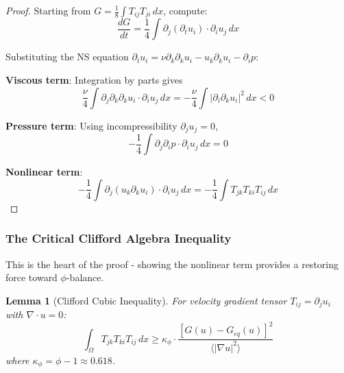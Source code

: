 \documentclass[12pt,a4paper]{article}
\newtheorem{lemma}[theorem]{Lemma}
\begin{document}
\begin{proof}
Starting from $G = \frac{1}{8} \int T_{ij} T_{ji}\, dx$, compute:
\begin{equation}
\frac{dG}{dt} = \frac{1}{4} \int \partial_j(\partial_t u_i) \cdot \partial_i u_j\, dx
\end{equation}

Substituting the NS equation $\partial_t u_i = \nu \partial_k \partial_k u_i - u_k \partial_k u_i - \partial_i p$:

\textbf{Viscous term}: Integration by parts gives
\begin{equation}
\frac{\nu}{4} \int \partial_j \partial_k \partial_k u_i \cdot \partial_i u_j\, dx = -\frac{\nu}{4} \int |\partial_i \partial_k u_i|^2\, dx < 0
\end{equation}

\textbf{Pressure term}: Using incompressibility $\partial_j u_j = 0$,
\begin{equation}
-\frac{1}{4} \int \partial_j \partial_i p \cdot \partial_i u_j\, dx = 0
\end{equation}

\textbf{Nonlinear term}: 
\begin{equation}
-\frac{1}{4} \int \partial_j(u_k \partial_k u_i) \cdot \partial_i u_j\, dx = -\frac{1}{4} \int T_{jk} T_{ki} T_{ij}\, dx
\end{equation}
\end{proof}

\subsubsection{The Critical Clifford Algebra Inequality}

This is the heart of the proof - showing the nonlinear term provides a restoring force toward $\phi$-balance.

\begin{lemma}[Clifford Cubic Inequality]
For velocity gradient tensor $T_{ij} = \partial_j u_i$ with $\nabla \cdot u = 0$:
\begin{equation}
\int_\Omega T_{jk} T_{ki} T_{ij}\, dx \geq \kappa_\phi \cdot \frac{[G(u) - G_{eq}(u)]^2}{\langle |\nabla u|^2 \rangle}
\end{equation}
where $\kappa_\phi = \phi - 1 \approx 0.618$.
\end{lemma}
\end{document}
